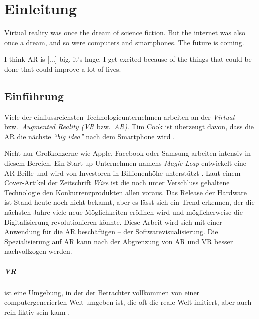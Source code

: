 \chapter{Einleitung}

\begin{fquote}
Virtual reality was once the dream of science fiction. But the internet was also once a dream, and so were computers and smartphones. The future is coming.
\end{fquote}

\begin{fquote}
I think AR is [...] big, it’s huge. I get excited because of the things that could be done that could improve a lot of lives.
\end{fquote}

\section{Einführung}
Viele der einflussreichsten Technologieunternehmen arbeiten an der \emph{Virtual} bzw.\ \emph{Augmented Reality (VR} bzw.\ \emph{AR)}. Tim Cook ist überzeugt davon, dass die AR die nächste \emph{``big idea''} nach dem Smartphone wird \cite{theindependent2017apple}.

Nicht nur Großkonzerne wie Apple, Facebook oder Samsung arbeiten intensiv in diesem Bereich. Ein Start-up-Unternehmen namens \emph{Magic Leap} entwickelt eine AR Brille und wird von Investoren in Billionenhöhe unterstützt \cite{kelly2016untold}. Laut einem Cover-Artikel der Zeitschrift \emph{Wire} ist die noch unter Verschluss gehaltene Technologie den Konkurrenzprodukten allen voraus. Das Release der Hardware ist Stand heute noch nicht bekannt, aber es lässt sich ein Trend erkennen, der die nächsten Jahre viele neue Möglichkeiten eröffnen wird und möglicherweise die Digitalisierung revolutionieren könnte.
Diese Arbeit wird sich mit einer Anwendung für die AR beschäftigen -- der Softwarevisualisierung. Die Spezialisierung auf AR kann nach der Abgrenzung von AR und VR besser nachvollzogen werden.

\paragraph{VR} ist eine Umgebung, in der der Betrachter vollkommen von einer computergenerierten Welt umgeben ist, die oft die reale Welt imitiert, aber auch rein fiktiv sein kann \cite{milgram1995augmented}.\\

